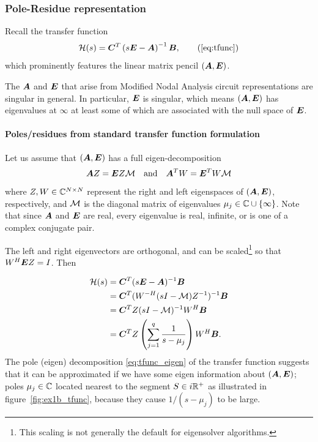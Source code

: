 \subsubsection{Pole-Residue representation}
Recall the transfer function  
\begin{equation}
\tf(s) = \CC^T\left(s\E-\A\right)^{-1}\BB,\tag{\ref{eq:tfunc}}
\end{equation}
which prominently features the linear matrix pencil $(\bm{A},\bm{E})$.  


\smallskip
\noindent The $\bm{A}$ and $\bm{E}$ that arise from Modified Nodal Analysis \cite{MNA} circuit representations are singular in general.  In particular, $\bm{E}$ is singular, which means $(\bm{A},\bm{E})$ has eigenvalues at $\infty$ at least some of which are associated with the null space of  $\bm{E}$.  

\paragraph{Poles/residues from standard transfer function formulation}
Let us assume that $(\bm{A},\bm{E})$ has a full eigen-decomposition 
        \begin{equation*}
                \bm{A} Z = \bm{E} Z \mathcal{M} \quad \text{and}\quad \bm{A}^T W = \bm{E}^T W \mathcal{M} 
        \label{eq:genEigDecomp}
        \end{equation*}
        where $Z,W\in\mathbb{C}^{N\times N}$ represent the
        right and left eigenspaces of $(\bm{A},\bm{E})$, respectively, and $\mathcal{M}$ is the diagonal matrix of eigenvalues $\mu_j\in\mathbb{C} \cup \{\infty\}$.  Note that since $\bm{A}$ and $\bm{E}$ are real, every eigenvalue is real, infinite,  or is one of a complex conjugate pair.
   
The left and right eigenvectors are orthogonal, and can be scaled\footnote{This scaling is not generally the default for eigensolver algorithms.}  so that $W^H \bm{E} Z = I$. Then 

\begin{equation}
\begin{aligned}
\mathcal{H}(s) &= \bm{C}^T(s\bm{E}-\bm{A})^{-1}\bm{B}\\
 &= \bm{C}^T ( W^{-H} (sI-\mathcal{M}) Z^{-1} )^{-1}\bm{B} \\
 &= \bm{C}^T Z (sI-\mathcal{M})^{-1} W^H \bm{B} \\
 &= \bm{C}^T Z \left(\sum_{j=1}^q \dfrac{1}{s-\mu_j} \right) W^H \bm{B}.\\
\end{aligned}
\label{eq:tfunc_eigen}
\end{equation}
The pole (eigen) decomposition \eqref{eq:tfunc_eigen}  of the transfer function suggests that it can be approximated if we have some eigen information about $(\bm{A},\bm{E})$; poles $\mu_j\in\mathbb{C}$ located nearest to the segment $S\in i\mathbb{R}^+$ as illustrated in  figure~\ref{fig:ex1b_tfunc}, because they cause $1/(s-\mu_j)$ to be large.   

